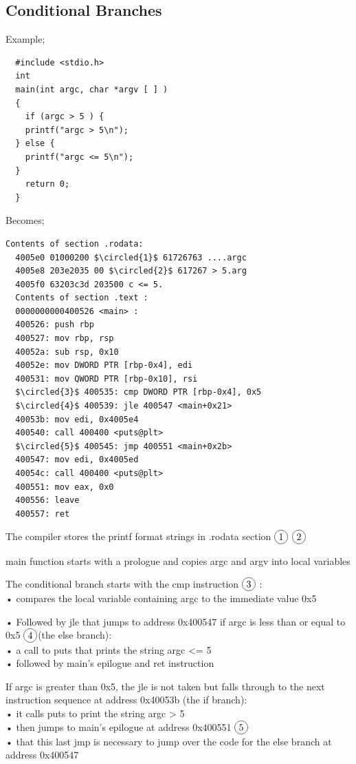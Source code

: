 \documentclass[]{project_plan}
\newcommand*\circled[1]{\tikz[baseline=(char.base)]{
            \node[shape=circle,draw,inner sep=2pt] (char) {#1};}}
\begin{document}
\subsection{Conditional Branches}

Example;
\begin{lstlisting}
  #include <stdio.h>
  int
  main(int argc, char *argv [ ] )
  {
    if (argc > 5 ) {
    printf("argc > 5\n");
  } else {
    printf("argc <= 5\n");
  }
    return 0;
  }
\end{lstlisting}
Becomes;
\begin{lstlisting}[mathescape]
  Contents of section .rodata:
  4005e0 01000200 $\circled{1}$ 61726763 ....argc
  4005e8 203e2035 00 $\circled{2}$ 617267 > 5.arg
  4005f0 63203c3d 203500 c <= 5.
  Contents of section .text :
  0000000000400526 <main> :
  400526: push rbp
  400527: mov rbp, rsp
  40052a: sub rsp, 0x10
  40052e: mov DWORD PTR [rbp-0x4], edi
  400531: mov QWORD PTR [rbp-0x10], rsi
  $\circled{3}$ 400535: cmp DWORD PTR [rbp-0x4], 0x5
  $\circled{4}$ 400539: jle 400547 <main+0x21>
  40053b: mov edi, 0x4005e4
  400540: call 400400 <puts@plt>
  $\circled{5}$ 400545: jmp 400551 <main+0x2b>
  400547: mov edi, 0x4005ed
  40054c: call 400400 <puts@plt>
  400551: mov eax, 0x0
  400556: leave
  400557: ret
\end{lstlisting}
The compiler stores the printf format strings in .rodata section $\circled{1}$ $\circled{2}$

main function starts with a prologue and copies argc and argv into local variables

The conditional branch starts with the cmp instruction $\circled{3}$ :\\
• compares the local variable containing argc to the immediate value 0x5

• Followed by jle that jumps to address 0x400547 if argc is less than or equal to 0x5 $\circled{4}$(the else
branch):\\
• a call to puts that prints the string argc <= 5\\
• followed by main’s epilogue and ret instruction

If argc is greater than 0x5, the jle is not taken but falls through to the next instruction sequence at
address 0x40053b (the if branch):\\
• it calls puts to print the string argc > 5\\
• then jumps to main’s epilogue at address 0x400551 $\circled{5}$\\
• that this last jmp is necessary to jump over the code for the else branch at address 0x400547
\end{document}
